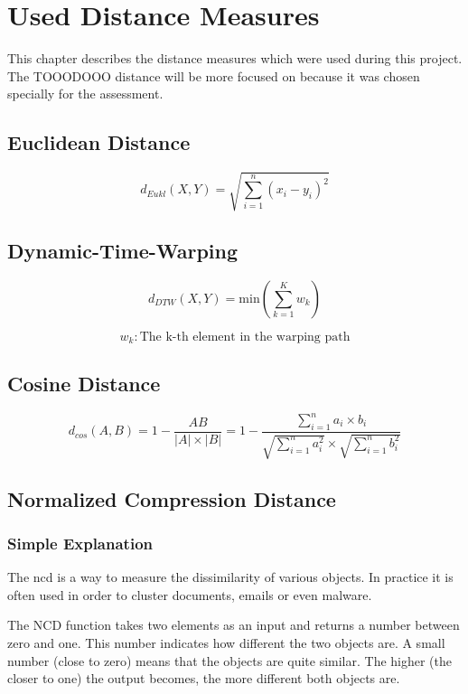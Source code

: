 \chapter{Used Distance Measures}

This chapter describes the distance measures which were used during this project. The TOOODOOO distance will be more focused on because it was chosen specially for the assessment.

\section{Euclidean Distance}

$$ d_{Eukl}(X,Y) = \sqrt{\sum_{i=1}^{n} (x_{i} - y_{i})^{2} } $$

\section{Dynamic-Time-Warping}



$$ d_{DTW}(X,Y) = \text{min}\left( \sum_{k=1}^{K}w_{k} \right) $$

$$ w_{k} : \text{The k-th element in the warping path} $$

\section{Cosine Distance}



$$ d_{cos}(A,B) = 1 - \frac{AB}{|A|\times|B|} 
                  = 1 - \frac{\sum_{i=1}^{n} a_{i}\times b_{i}}
                  { \sqrt{ \sum_{i=1}^{n} a_{i}^{2} } \times \sqrt{ \sum_{i=1}^{n} b_{i}^{2} } } $$


\clearpage
\section{Normalized Compression Distance}
\subsection{Simple Explanation}

The \ac{ncd} is a way to measure the dissimilarity of various objects. In practice it is often used in order to cluster documents, emails or even malware.


The NCD function takes two elements as an input and returns a number between zero and one. This number indicates how different the two objects are. A small number (close to zero) means that the objects are quite similar. The higher (the closer to one) the output becomes, the more different both objects are.


